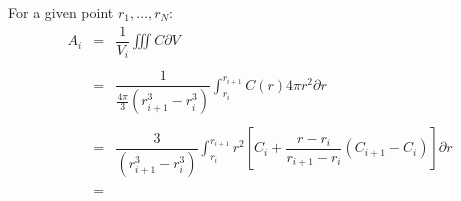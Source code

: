 \documentclass[aps,onecolumn,11pt]{revtex4}
\begin{document}
For a given point $r_1,\ldots,r_N$:
\begin{equation}
\begin{array}{rcl}
	A_i & = & \displaystyle\dfrac{1}{V_i} \iiint C \partial V \\
	\\
	& = & \displaystyle \dfrac{1}{\frac{4\pi}{3}  \left( r_{i+1}^3 - r_{i}^3 \right)} \int_{r_i}^{r_{i+1}} C(r) 4\pi r^2 \partial r\\
	\\
	& = & \displaystyle \dfrac{3}{\left( r_{i+1}^3 - r_{i}^3 \right)} \int_{r_i}^{r_{i+1}}   r^2 \left[ C_{i} + \dfrac{r-r_i}{r_{i+1}-r_i} \left(C_{i+1}-C_{i}\right) \right]  \partial r\\ \\
	& = & %
\end{array}
\end{equation} 
\end{document}
